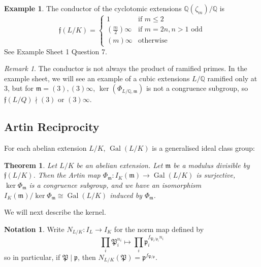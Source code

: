 \documentclass[11pt]{article}
\theoremstyle{definition}
\newtheorem{example}[definition]{Example}
\newtheorem{notation}[definition]{Notation}
\theoremstyle{plain}
\newtheorem{theorem}[definition]{Theorem}
\theoremstyle{remark}
\newtheorem{remark}[definition]{Remark}
\DeclareMathOperator{\Gal}{Gal}
\newcommand{\QQ}{\mathbb{Q}}
\newcommand{\cp}{\mathfrak{P}}
\newcommand{\ff}{\mathfrak{f}}
\newcommand{\fp}{\mathfrak{p}}
\newcommand{\fm}{\mathfrak{m}}
\begin{document}
\begin{example}\label{eg:3_4}
    The conductor of the cyclotomic extensions $\QQ(\zeta_m)/\QQ$ is
    \begin{equation*}
        \ff(L/K) =
        \begin{cases}
            1 & \text{if } m \le 2\\
            (\frac{m}{2}) \infty &\text{if } m = 2n, n>1 \text{ odd}\\
            (m) \infty &\text{otherwise}
        \end{cases}
    \end{equation*}
    See Example Sheet 1 Question 7.
\end{example}

\begin{remark}\label{rem:3_5}
    The conductor is not always the product of ramified primes. In the example sheet, we will see an example of a cubic extensions $L/\QQ$ ramified only at $3$, but for $\fm = (3), (3)\infty$, $\ker(\Phi_{L/\QQ, \fm})$ is not a congruence subgroup, so $\ff(L/Q) \nmid (3)$ or $(3) \infty$.
\end{remark}

\subsection{Artin Reciprocity}

For each abelian extension $L/K$, $\Gal(L/K)$ is a generalised ideal class group:

\begin{theorem}\label{thm:3_6}
    Let $L/K$ be an abelian extension. Let $\fm$ be a modulus divisible by $\ff(L/K)$. Then the Artin map $\Phi_\fm : I_K(\fm) \to \Gal(L/K)$ is surjective, $\ker{\Phi_\fm}$ is a congruence subgroup, and we have an isomorphism $I_K(\fm)/\ker \Phi_\fm \cong \Gal(L/K)$ induced by $\Phi_\fm$.
\end{theorem}

We will next describe the kernel.

\begin{notation}\label{not:3_7}
    Write $N_{L/K} : I_L \to I_K$ for the norm map defined by
    \begin{equation*}
        \prod_i \cp_i^{n_i} \mapsto \prod_i \fp_i^{f_{\cp_i / \fp_i} n_i}
    \end{equation*}
    so in particular, if $\cp \mid \fp$, then $N_{L/K}(\cp) = \fp^{f_{\cp/\fp}}$.
\end{notation}
\end{document}
